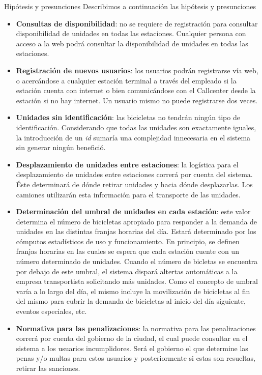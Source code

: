\begin{subsection}{Hipótesis y presunciones}
Describimos a continuación las hipótesis y presunciones 
\begin{itemize}
\item \textbf{Consultas de disponibilidad}: no se requiere de registración para consultar disponibilidad de unidades en todas las estaciones. Cualquier persona con acceso a la web podrá consultar la disponibilidad de unidades en todas las estaciones. 

\item \textbf{Registración de nuevos usuarios}: los usuarios podrán registrarse vía web, o acercándose a cualquier estación terminal a través del empleado si la estación cuenta con internet o bien comunicándose con el Callcenter desde la estación si no hay internet. Un usuario mismo no puede registrarse dos veces.

\item \textbf{Unidades sin identificación}: las bicicletas no tendrán ningún tipo de identificación. Considerando que todas las unidades son exactamente iguales, la introducción de un \emph{id} sumaría una complejidad innecesaria en el sistema sin generar ningún benefició.

\item \textbf{Desplazamiento de unidades entre estaciones}: la logística para el desplazamiento de unidades entre estaciones correrá por cuenta del sistema. Éste determinará de dónde retirar unidades y hacia dónde desplazarlas. Los camiones utilizarán esta información para el transporte de las unidades.

\item \textbf{Determinación del umbral de unidades en cada estación}: este valor determina el número de bicicletas apropiado para responder a la demanda de unidades en las distintas franjas horarias del día. Estará determinado por los cómputos estadísticos de uso y funcionamiento. En principio, se definen franjas horarias en las cuales se espera que cada estación cuente con un número determinado de unidades. Cuando el número de bicletas se encuentra por debajo de este umbral, el sistema dispará altertas automáticas a la empresa transportista solicitando más unidades. Como el concepto de umbral varía a lo largo del día, el mismo incluye la movilización de bicicletas al fin del mismo para cubrir la demanda de bicicletas al inicio del día siguiente, eventos especiales, etc.

\item \textbf{Normativa para las penalizaciones}: la normativa para las penalizaciones correrá por cuenta del gobierno de la ciudad, el cual puede consultar en el sistema a los usuarios incumplidores. Será el gobierno el que determine las penas y/o multas para estos usuarios y posteriormente si estas son resueltas, retirar las sanciones.


\end{itemize}
\end{subsection}
